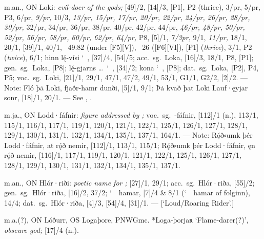 \begin{itemize}
 m.an., ON Loki:
  \emph{evil-doer of the gods;} [49]/2, [14]/3, [P1], P2 (thrice), 3/pr, 5/pr, P3, 6/pr, \emph{9/pr,} 10/3, \emph{13/pr, 15/pr, 17/pr, 20/pr, 22/pr, 24/pr, 26/pr, 28/pr, 30/pr,} 32/pr, 34/pr, 36/pr, 38/pr, 40/pr, 42/pr, 44/pr, \emph{46/pr, 48/pr, 50/pr, 52/pr, 56/pr, 58/pr, 60/pr, 62/pr, 64/pr,} P8, [5]/1, \emph{7/3pr,} 9/1, \emph{11/pr,} 18/1, 20/1, [39]/1, 40/1,
  \Gylfaginning~49:82 (under [F5][V]), \Skaldskaparmal\ 26 ([F6][VI]),
  [P1] (\emph{thrice}), 3/1, P2 (\emph{twice}), 6/1;
  hinn lę́-vísi \char`~, [37]/4, [54]/5; acc.~sg.~Loka, [16]/3, 18/1, P8, [P1];
  gen.~sg.~Loka, [P8]; lę́-gjarns \dots\ \char`~, [34]/2; kona \char`~, [P8]; dat.~sg.~Loka, [P2], P4, P5; voc.~sg.~Loki, [21]/1, 29/1, 47/1, 47/2, 49/1, 53/1, G1/1, G2/2, [2]/2.
  --- Note: Fló þȧ Loki, fjaðr-hamr dunði, [5]/1, 9/1; Þȧ kvað þat Loki Lauf·ęyjar sonr, [18]/1, 20/1.
  --- See , .

 m.ja., ON Lodd·fáfnir:
  \emph{figure addressed by ;} voc.~sg.~-fáfnir, [112]/1 (n.), 113/1, 115/1, 116/1, 117/1, 119/1, 120/1, 121/1, 122/1, 125/1, 126/1, 127/1, 128/1, 129/1, 130/1, 131/1, 132/1, 134/1, 135/1, 137/1, 164/1.
  --- Note: Rǫ́ð⸗umk þér Lodd·fáfnir, at rǫ́ð nemir, [112]/1, 113/1, 115/1; Rǫ́ð⸗umk þér Lodd·fáfnir, ęn rǫ́ð nemir, [116]/1, 117/1, 119/1, 120/1, 121/1, 122/1, 125/1, 126/1, 127/1, 128/1, 129/1, 130/1, 131/1, 132/1, 134/1, 135/1, 137/1.

 m.an., ON Hlór·riði:
  \emph{poetic name for ;} [27]/1, 29/1; acc.~sg.~Hlór·riða, [55]/2; gen.~sg.~Hlór·riða, [16]/2, 37/2; \char`~\ hamar, [7]/4 \& 8/1 (\char`~\ hamar of folginn), 14/4; dat.~sg.~Hlór·riða, [4]/3, [54]/4, [31]/1. ---
  [‘Loud/Roaring Rider’.]

 m.a.(?), ON Lóðurr, OS Logaþore, PNWGmc. *Loga-þorjaʀ ‘Flame-darer(?)’,
\emph{obscure god;} [17]/4 (n.).


\end{itemize}
